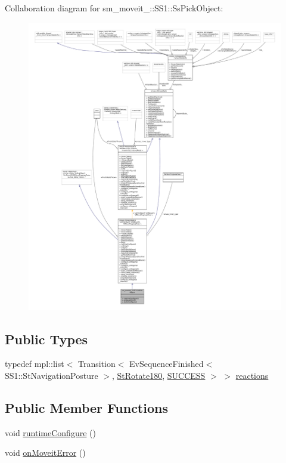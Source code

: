 Collaboration diagram for sm\+\_\+moveit\+\_\+:\+:S\+S1\+:\+:Ss\+Pick\+Object\+:
\nopagebreak
\begin{figure}[H]
\begin{center}
\leavevmode
\includegraphics[width=350pt]{structsm__moveit__3_1_1SS1_1_1SsPickObject__coll__graph}
\end{center}
\end{figure}
\subsection*{Public Types}
\begin{DoxyCompactItemize}
\item 
typedef mpl\+::list$<$ Transition$<$ Ev\+Sequence\+Finished$<$ S\+S1\+::\+St\+Navigation\+Posture $>$, \hyperlink{structsm__moveit__3_1_1StRotate180}{St\+Rotate180}, \hyperlink{classSUCCESS}{S\+U\+C\+C\+E\+SS} $>$ $>$ \hyperlink{structsm__moveit__3_1_1SS1_1_1SsPickObject_a52fed7b341cb095472bec9fd99dc3419}{reactions}
\end{DoxyCompactItemize}
\subsection*{Public Member Functions}
\begin{DoxyCompactItemize}
\item 
void \hyperlink{structsm__moveit__3_1_1SS1_1_1SsPickObject_ab6c69d020a7630c4b8a81fc4241a33f0}{runtime\+Configure} ()
\item 
void \hyperlink{structsm__moveit__3_1_1SS1_1_1SsPickObject_ab2cf544834abb6a7b9032f58c228c12c}{on\+Moveit\+Error} ()
\end{DoxyCompactItemize}
